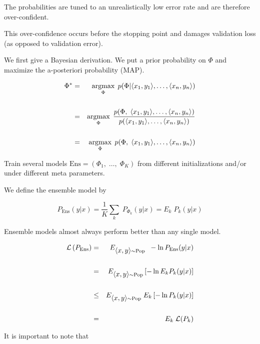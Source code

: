 {\vfill
The probabilities are tuned to an unrealistically low error rate and are therefore over-confident.

\vfill
This over-confidence occurs before the stopping point and damages validation loss (as opposed to validation error).


We first give a Bayesian derivation. We put a prior probability on $\Phi$ and maximize the a-posteriori probability (MAP).

\vfill
{\huge
\begin{eqnarray*}
\Phi^* & = & \operatorname*{argmax}_\Phi\;p(\Phi | {\mbox{$\langle x_1,y_1\rangle$}},\ldots,{\mbox{$\langle x_n,y_n\rangle$}}) \\
\\
 & = & \operatorname*{argmax}_\Phi\;\frac{p(\Phi,\; {\mbox{$\langle x_1,y_1\rangle$}},\ldots,{\mbox{$\langle x_n,y_n\rangle$}})}{p({\mbox{$\langle x_1,y_1\rangle$}},\ldots,{\mbox{$\langle x_n,y_n\rangle$}})} \\
\\
 & = & \operatorname*{argmax}_\Phi\;p(\Phi,\;{\mbox{$\langle x_1,y_1\rangle$}},\ldots,{\mbox{$\langle x_n,y_n\rangle$}})
 \end{eqnarray*}
}


Train several models $\mathrm{Ens} = (\Phi_1,\;\ldots,\; \Phi_K)$ from different initializations and/or under different meta parameters.

\vfill
We define the ensemble model by

$$P_\mathrm{Ens}(y|x) = \frac{1}{K} \sum_k\; P_{\Phi_k}(y|x) = E_k \;P_k(y|x)$$

\vfill
Ensemble models almost always perform better than any single model.


\vfill
{}

\begin{eqnarray*}
{\cal L}\left(P_\mathrm{Ens}\right) & = & E_{{\mbox{$\langle x,y\rangle$}} \sim \mathrm{Pop}}\;\;-\ln P_\mathrm{Ens}(y|x) \\
\\
 & = & E_{{\mbox{$\langle x,y\rangle$}} \sim \mathrm{Pop}}\left[-\ln E_k P_k(y|x)\right] \\
\\
& \leq & E_{{\mbox{$\langle x,y\rangle$}} \sim \mathrm{Pop}} \;E_k\left[-\ln P_k(y|x)\right] \\
\\
& = & E_k\; {\cal L}(P_k)
\end{eqnarray*}


It is important to note that

}

